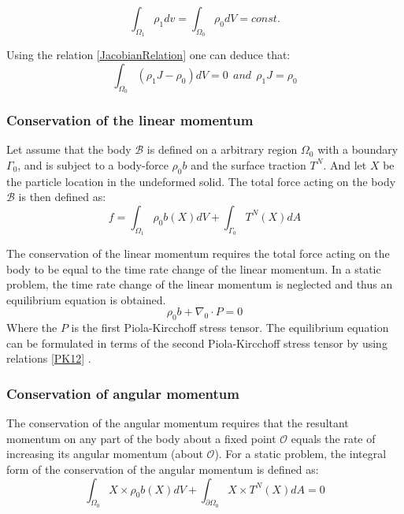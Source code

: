 \begin{equation}
\int_{\Omega_1} \rho_1 dv = \int_{\Omega_0} \rho_0 dV = const. 
\end{equation}


Using the relation \ref{JacobianRelation} one can deduce that:
\begin{equation}
\int_{\Omega_0} \left( \rho_1 J - \rho_0\right)dV = 0 \  \ and \  \ \rho_1 J = \rho_0
\end{equation}
\subsubsection*{Conservation of the linear momentum}
Let assume that the body $\mathcal{B}$ is defined on a arbitrary region $\Omega_0$ with a boundary $\Gamma_0$, and is subject to a body-force $\rho_0  b$ and the surface traction $T^N$. And let $X$ be the particle location in the undeformed solid.
 The total force acting on the body $\mathcal{B}$ is then defined as:
\begin{equation}
f = \int_{\Omega_1}\rho_0 b(X)dV + \int_{\Gamma_0} T^N(X)dA
\end{equation}
 
The conservation of the linear momentum requires the total force acting on the body to be equal to the time rate change of the linear momentum. In a static problem, the time rate change of the linear momentum is neglected and thus an equilibrium equation is obtained.
\begin{equation}
\rho_0 b+\nabla_0 \cdot P  = 0
\end{equation}
Where the $P$ is the first Piola-Kircchoff stress tensor.	
The equilibrium equation can be formulated in terms of the second Piola-Kircchoff stress tensor by using relations \ref{PK12} .
\subsubsection*{Conservation of angular momentum}
The conservation of the angular momentum requires that the resultant momentum on any part of the body about a fixed point $\mathcal{O}$ equals the rate of increasing its angular momentum (about $\mathcal{O}$). For a static problem, the integral form of the conservation of the angular momentum is defined as:
\begin{equation}
\label{angularMomentum}
\int_{\Omega_0} X \times \rho_0 b(X)dV + \int_{\partial \Omega_0} X \times  T^N(X)dA = 0
\end{equation}

